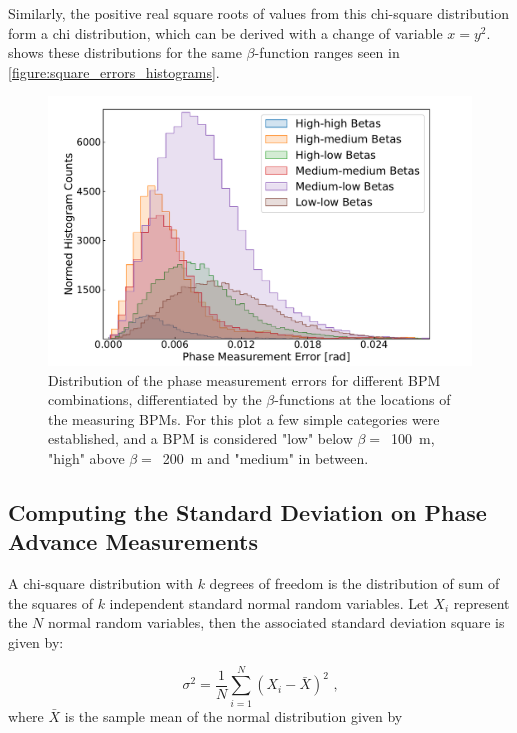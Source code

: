 Similarly, the positive real square roots of values from this chi-square distribution form a chi distribution, which can be derived with a change of variable \(x=y^2\).
 shows these distributions for the same \(\beta\)-function ranges seen in \cref{figure:square_errors_histograms}.

\begin{figure}[!htb]
    \centering
    \includegraphics*[width=\textwidth]{Figures/Other_Studies/phase_errors_distributions.pdf}
    \caption{Distribution of the phase measurement errors for different BPM combinations, differentiated by the \(\beta\)-functions at the locations of the measuring BPMs. For this plot a few simple categories were established, and a BPM is considered "low" below \(\beta =\)~\qty{100}{\meter}, "high" above \(\beta =\)~\qty{200}{\meter} and "medium" in between.}
    \label{figure:phase_errors_histograms}
\end{figure}

\subsection*{Computing the Standard Deviation on Phase Advance Measurements}

A chi-square distribution with \(k\) degrees of freedom  is the distribution of sum of the squares of \(k\) independent standard normal random variables.
Let \(X_{i}\) represent the \(N\) normal random variables, then the associated standard deviation square is given by:

\begin{equation}
    \sigma^{2} = \frac{1}{N} \sum_{i=1}^{N} \left( X_{i} - \bar{X} \right)^{2} \text{ ,}
    \label{equation:chi2_dist_build_from_normals}
\end{equation}
where \(\bar{X}\) is the sample mean of the normal distribution given by


